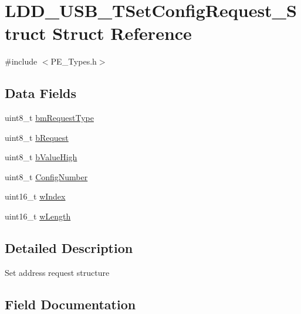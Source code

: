 \hypertarget{struct_l_d_d___u_s_b___t_set_config_request___struct}{}\section{L\+D\+D\+\_\+\+U\+S\+B\+\_\+\+T\+Set\+Config\+Request\+\_\+\+Struct Struct Reference}
\label{struct_l_d_d___u_s_b___t_set_config_request___struct}


{\ttfamily \#include $<$P\+E\+\_\+\+Types.\+h$>$}

\subsection*{Data Fields}
\begin{DoxyCompactItemize}
\item 
uint8\+\_\+t \hyperlink{struct_l_d_d___u_s_b___t_set_config_request___struct_aa3e4ca8e83424e5496478991dac0361a}{bm\+Request\+Type}
\item 
uint8\+\_\+t \hyperlink{struct_l_d_d___u_s_b___t_set_config_request___struct_a12a9d3e8bd01f75b681c1749d2595f42}{b\+Request}
\item 
uint8\+\_\+t \hyperlink{struct_l_d_d___u_s_b___t_set_config_request___struct_a55df59e0060cfd0bc6e9bdc53b9a0d99}{b\+Value\+High}
\item 
uint8\+\_\+t \hyperlink{struct_l_d_d___u_s_b___t_set_config_request___struct_a9a545d7858a7ee85dbe37eaf2b4b7e01}{Config\+Number}
\item 
uint16\+\_\+t \hyperlink{struct_l_d_d___u_s_b___t_set_config_request___struct_ad2aa2851b128777e842b2ac796d2f664}{w\+Index}
\item 
uint16\+\_\+t \hyperlink{struct_l_d_d___u_s_b___t_set_config_request___struct_a66312977eb5816459d0201a2bacaf9b5}{w\+Length}
\end{DoxyCompactItemize}


\subsection{Detailed Description}
Set address request structure 

\subsection{Field Documentation}
\hypertarget{struct_l_d_d___u_s_b___t_set_config_request___struct_aa3e4ca8e83424e5496478991dac0361a}{}
